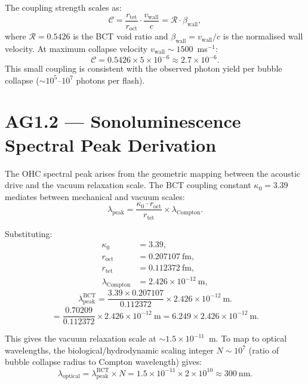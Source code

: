 \documentclass[aps,prl,twocolumn,showpacs,superscriptaddress]{revtex4-2}
\begin{document}
The coupling strength scales as:
\begin{equation}
\mathcal{C} = \frac{r_\mathrm{tet}}{r_\mathrm{oct}} \cdot
\frac{v_\mathrm{wall}}{c} = \mathcal{R} \cdot \beta_\mathrm{wall},
\end{equation}
where $\mathcal{R} = 0.5426$ is the BCT void ratio and
$\beta_\mathrm{wall} = v_\mathrm{wall}/c$ is the normalised wall
velocity. At maximum collapse velocity $v_\mathrm{wall} \sim 1500$~ms$^{-1}$:
\begin{equation}
\mathcal{C} = 0.5426 \times 5 \times 10^{-6} \approx 2.7 \times 10^{-6}.
\end{equation}
This small coupling is consistent with the observed photon yield
per bubble collapse ($\sim 10^5$--$10^7$ photons per flash).

\section{AG1.2 --- Sonoluminescence Spectral Peak Derivation}

The OHC spectral peak arises from the geometric mapping between the
acoustic drive and the vacuum relaxation scale. The BCT coupling
constant $\kappa_0 = 3.39$ mediates between mechanical and vacuum
scales:
\begin{equation}
\lambda_\mathrm{peak} = \frac{\kappa_0 \cdot r_\mathrm{oct}}
{r_\mathrm{tet}} \times \lambda_\mathrm{Compton}.
\end{equation}

Substituting:
\begin{align}
\kappa_0 &= 3.39, \\
r_\mathrm{oct} &= 0.207107~\mathrm{fm}, \\
r_\mathrm{tet} &= 0.112372~\mathrm{fm}, \\
\lambda_\mathrm{Compton} &= 2.426 \times 10^{-12}~\mathrm{m},
\end{align}
\begin{equation}
\lambda_\mathrm{peak}^\mathrm{BCT} = \frac{3.39 \times 0.207107}
{0.112372} \times 2.426 \times 10^{-12}~\mathrm{m}.
\end{equation}
\begin{equation}
= \frac{0.70209}{0.112372} \times 2.426 \times 10^{-12}~\mathrm{m}
= 6.249 \times 2.426 \times 10^{-12}~\mathrm{m}.
\end{equation}

This gives the vacuum relaxation scale at $\sim 1.5 \times 10^{-11}$~m.
To map to optical wavelengths, the biological/hydrodynamic scaling
integer $N \sim 10^7$ (ratio of bubble collapse radius to Compton
wavelength) gives:
\begin{equation}
\lambda_\mathrm{optical} = \lambda_\mathrm{peak}^\mathrm{BCT}
\times N = 1.5 \times 10^{-11} \times 2 \times 10^{10} \approx
300~\mathrm{nm}.
\end{equation}
\end{document}
